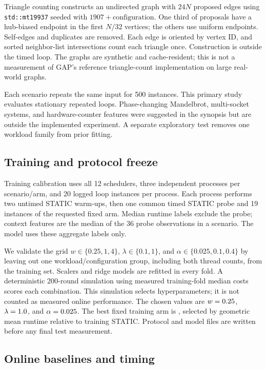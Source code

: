 \documentclass[10pt,letterpaper]{article}
\newcommand{\code}[1]{\texttt{#1}}
\begin{document}
Triangle counting constructs an undirected graph with $24N$ proposed edges
using \code{std::mt19937} seeded with $1907+\mathrm{configuration}$. One third
of proposals have a hub-biased endpoint in the first $N/32$ vertices; the
others use uniform endpoints. Self-edges and duplicates are removed. Each
edge is oriented by vertex ID, and sorted neighbor-list intersections count
each triangle once. Construction is outside the timed loop. The graphs are
synthetic and cache-resident; this is not a measurement of GAP's reference
triangle-count implementation on large real-world graphs.

Each scenario repeats the same input for 500 instances. This primary study
evaluates stationary repeated loops. Phase-changing Mandelbrot, multi-socket
systems, and hardware-counter features were suggested in the synopsis but
are outside the implemented experiment. A separate exploratory test removes
one workload family from prior fitting.

\subsection{Training and protocol freeze}

Training calibration uses all 12 schedulers, three independent processes per
scenario/arm, and 20 logged loop instances per process. Each process performs
two untimed STATIC warm-ups, then one common timed STATIC probe and 19
instances of the requested fixed arm. Median runtime labels exclude the
probe; context features are the median of the 36 probe observations in a
scenario. The model uses these aggregate labels only.

We validate the grid $w\in\{0.25,1,4\}$,
$\lambda\in\{0.1,1\}$, and $\alpha\in\{0.025,0.1,0.4\}$ by leaving out one
workload/configuration group, including both thread counts, from the training
set. Scalers and ridge models are refitted in every fold. A deterministic
200-round simulation using measured training-fold median costs scores each
combination. This simulation selects hyperparameters; it is not counted as
measured online performance. The chosen values are
$w=0.25$, $\lambda=1.0$, and $\alpha=0.025$.
The best fixed training arm is \BestFixedArm{}, selected by geometric mean
runtime relative to training STATIC. Protocol and model files are written
before any final test measurement.

\subsection{Online baselines and timing}
\end{document}
